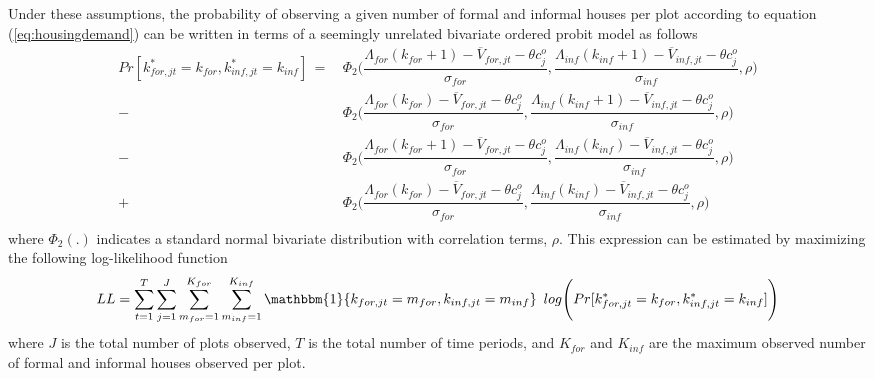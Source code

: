 \documentclass[12pt]{article}
\begin{document}
Under these assumptions, the probability of observing a given number of formal and informal houses per plot according to equation (\ref{eq:housingdemand}) can be written in terms of a seemingly unrelated bivariate ordered probit model as follows \citep{sajaia2008maximum}
\begin{align*}
Pr[ k_{for,jt}^{*} =k_{for} , k_{inf,jt}^{*} =k_{inf} ] \, = \, &  \Phi_2\Bigg(\dfrac{\Lambda_{for}(k_{for}+1) - \overline{V}_{for,jt} - \theta c^{o}_{j}}{\sigma_{for}}, \dfrac{\Lambda_{inf}(k_{inf}+1) - \overline{V}_{inf,jt} - \theta c^{o}_{j}}{\sigma_{inf}} , \rho \Bigg) \\
- \, &\Phi_2\Bigg(\dfrac{\Lambda_{for}(k_{for}) - \overline{V}_{for,jt} - \theta c^{o}_{j}}{\sigma_{for}}, \dfrac{\Lambda_{inf}(k_{inf}+1) - \overline{V}_{inf,jt} - \theta c^{o}_{j}}{\sigma_{inf}} , \rho \Bigg) \\
- \, &\Phi_2\Bigg(\dfrac{\Lambda_{for}(k_{for}+1) - \overline{V}_{for,jt} - \theta c^{o}_{j}}{\sigma_{for}}, \dfrac{\Lambda_{inf}(k_{inf}) - \overline{V}_{inf,jt} - \theta c^{o}_{j}}{\sigma_{inf}} , \rho \Bigg) \\
+ \, &\Phi_2\Bigg(\dfrac{\Lambda_{for}(k_{for}) - \overline{V}_{for,jt} - \theta c^{o}_{j}}{\sigma_{for}}, \dfrac{\Lambda_{inf}(k_{inf}) - \overline{V}_{inf,jt} - \theta c^{o}_{j}}{\sigma_{inf}} , \rho \Bigg) \\
\end{align*}
\noindent where $\Phi_{2}(.)$ indicates a standard normal bivariate distribution with correlation terms, $\rho$.  This expression can be estimated by maximizing the following log-likelihood function
\begin{align}
\label{eq:demandll}
LL = \sum_{t=1}^{T} \sum_{j=1}^{J} \sum_{m_{for}=1}^{K_{for}} \sum_{m_{inf}=1}^{K_{inf}} \mathbbm{1} \{k_{for,jt} = m_{for}, k_{inf,jt} = m_{inf}\} \,\,\, log \Bigg( Pr[ k_{for,jt}^{*} =k_{for} , k_{inf,jt}^{*} =k_{inf} ] \Bigg)
\end{align}
\noindent where $J$ is the total number of plots observed, $T$ is the total number of time periods, and $K_{for}$ and $K_{inf}$ are the maximum observed number of formal and informal houses observed per plot.  





\end{document}
